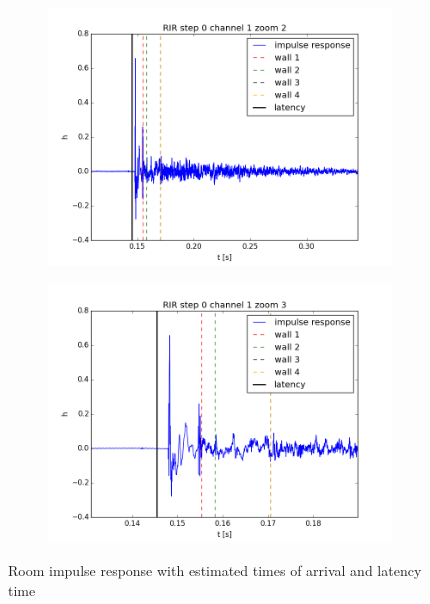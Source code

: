 \begin{figure}[H]
	\centering		
	\begin{subfigure}[b]{0.49\linewidth}
        \centering
		\includegraphics[width=\linewidth]{files/0_1_RIR_zoom2.png}
	\end{subfigure} 
	\begin{subfigure}[b]{0.49\linewidth}
        \centering
		\includegraphics[width=\linewidth]{files/0_1_RIR_zoom3.png}
	\end{subfigure}
	\caption{Room impulse response with estimated times of arrival and latency time} 
	\label{fig:RIR_zooms}
\end{figure}

